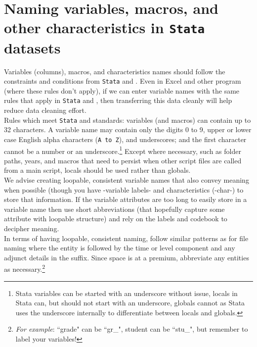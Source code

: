 \documentclass[11pt]{article}
\begin{document}
\section{Naming variables, macros, and other characteristics in \texttt{Stata} datasets} \label{sec:variables}
Variables (columns), macros, and characteristics names should follow the constraints and conditions from \texttt{Stata} and \faRProject. Even in Excel and other program (where these rules don't apply), if we can enter variable names with the same rules that apply in \texttt{Stata} and \faRProject, then transferring this data cleanly will help reduce data cleaning effort. \\

Rules which meet \texttt{Stata} and \faRProject standards:  variables (and macros) can contain up to \textsf{32} characters. A variable name may contain only the digits 0 to 9, upper or lower case English alpha characters (\texttt{A to Z}), and underscores; and the first character cannot be a number or an underscore.\footnote{Stata variables can be started with an underscore without issue, locals in Stata can, but should not start with an underscore, globals cannot as Stata uses the underscore internally to differentiate between locals and globals.} Except where necessary, such as folder paths, years, and macros that need to persist when other script files are called from a main script, locals should be used rather than globals. \\

We advise creating \textsf{loopable}, consistent variable names that also convey meaning when possible (though you have -variable labels- and characteristics (-char-) to store that information. If the variable attributes are too long to easily store in a variable name then use short abbreviations (that hopefully capture some attribute with loopable structure) and rely on the labels and codebook to decipher meaning. \\

In terms of having loopable, consistent naming, follow similar patterns as for file naming where the entity is followed by the time or level component and any adjunct details in the suffix. Since space is at a premium, abbreviate any entities as necessary.\footnote{\textit{For example}: ``grade" can be ``gr\_", student can be ``stu\_", but remember to label your variables!}
\end{document}
